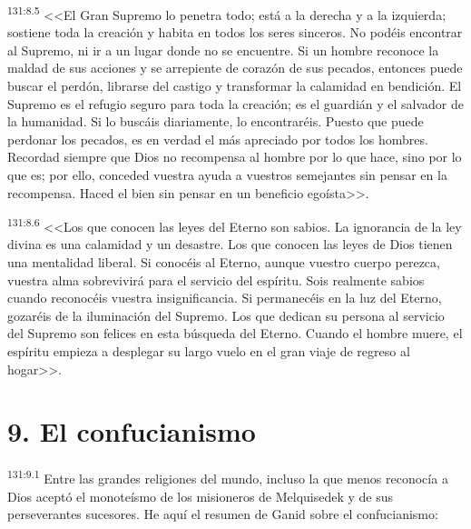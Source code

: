 \par 
\textsuperscript{131:8.5} <<El Gran Supremo lo penetra todo; está a la derecha y a la izquierda; sostiene toda la creación y habita en todos los seres sinceros. No podéis encontrar al Supremo, ni ir a un lugar donde no se encuentre. Si un hombre reconoce la maldad de sus acciones y se arrepiente de corazón de sus pecados, entonces puede buscar el perdón, librarse del castigo y transformar la calamidad en bendición. El Supremo es el refugio seguro para toda la creación; es el guardián y el salvador de la humanidad. Si lo buscáis diariamente, lo encontraréis. Puesto que puede perdonar los pecados, es en verdad el más apreciado por todos los hombres. Recordad siempre que Dios no recompensa al hombre por lo que hace, sino por lo que es; por ello, conceded vuestra ayuda a vuestros semejantes sin pensar en la recompensa. Haced el bien sin pensar en un beneficio egoísta>>.

\par 
\textsuperscript{131:8.6} <<Los que conocen las leyes del Eterno son sabios. La ignorancia de la ley divina es una calamidad y un desastre. Los que conocen las leyes de Dios tienen una mentalidad liberal. Si conocéis al Eterno, aunque vuestro cuerpo perezca, vuestra alma sobrevivirá para el servicio del espíritu. Sois realmente sabios cuando reconocéis vuestra insignificancia. Si permanecéis en la luz del Eterno, gozaréis de la iluminación del Supremo. Los que dedican su persona al servicio del Supremo son felices en esta búsqueda del Eterno. Cuando el hombre muere, el espíritu empieza a desplegar su largo vuelo en el gran viaje de regreso al hogar>>.

\section*{9. El confucianismo}
\par 
\textsuperscript{131:9.1} Entre las grandes religiones del mundo, incluso la que menos reconocía a Dios aceptó el monoteísmo de los misioneros de Melquisedek y de sus perseverantes sucesores. He aquí el resumen de Ganid sobre el confucianismo:

